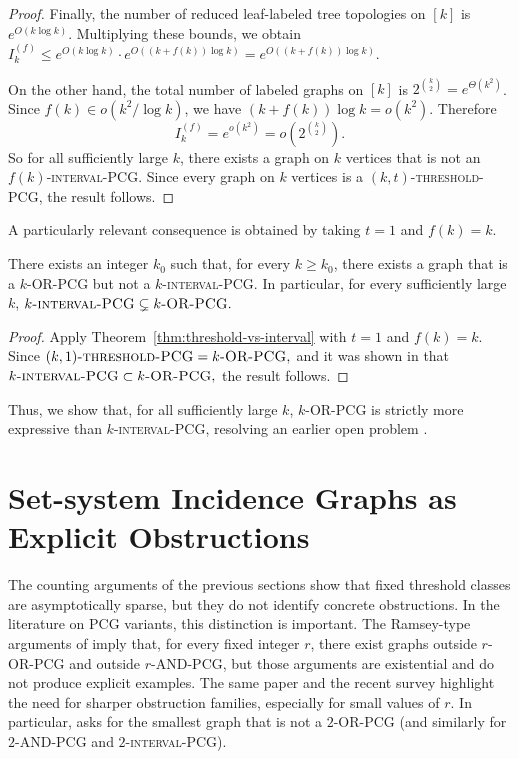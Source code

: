 \documentclass[a4paper,UKenglish,cleveref,autoref,thm-restate]{socg-lipics-v2021}
\begin{document}
\begin{proof}
Finally, the number of reduced leaf-labeled tree topologies on \([k]\) is
\(e^{O(k\log k)}\). Multiplying these bounds, we obtain
\(
I_k^{(f)}
\le e^{O(k\log k)}\cdot e^{O((k+f(k))\log k)}
 = e^{O((k+f(k))\log k)}.
\)

On the other hand, the total number of labeled graphs on $[k]$ is
$2^{\binom{k}{2}}=e^{\Theta(k^2)}$. Since $f(k)\in o(k^2/\log k)$, we have
$(k+f(k))\log k=o(k^2)$. Therefore
\[
I_k^{(f)} = e^{o(k^2)} = o\!\left(2^{\binom{k}{2}}\right).
\]
So for all sufficiently large $k$, there exists a graph on $k$ vertices that is not an
\textsc{$f(k)$-interval-\textsc{PCG}}. Since every graph on $k$ vertices is a
\textsc{$(k,t)$-threshold-\textsc{PCG}}, the result follows.
\end{proof}
A particularly relevant consequence is obtained by taking $t=1$ and $f(k)=k$.

\begin{corollary}\label{cor:kinterval-vs-kor}
There exists an integer $k_0$ such that, for every $k\ge k_0$, there exists a graph
that is a \textsc{$k$-\textsc{OR}-\textsc{PCG}} but not a
\textsc{$k$-interval-\textsc{PCG}}. In particular, for every sufficiently large $k$,
\(
k\textsc{-interval-\textsc{PCG}} \subsetneq k\textsc{-OR-\textsc{PCG}}.
\)
\end{corollary}

\begin{proof}
Apply Theorem~\ref{thm:threshold-vs-interval} with $t=1$ and $f(k)=k$. Since
\(
(k,1)\textsc{-threshold-\textsc{PCG}} = k\textsc{-OR-\textsc{PCG}},
\)
and it was shown in \cite{Calamoneri2021OnGOI} that
\(
k\textsc{-interval-\textsc{PCG}} \subset k\textsc{-OR-\textsc{PCG}},
\)
the result follows.
\end{proof}

Thus, we show that, for all sufficiently large $k$, \textsc{$k$-\textsc{OR}-\textsc{PCG}} is strictly
more expressive than \textsc{$k$-interval-\textsc{PCG}}, resolving an earlier open problem \cite{Calamoneri2021OnGOI, survey}.


\section{Set-system Incidence Graphs as Explicit Obstructions}\label{sec:incidence}

The counting arguments of the previous sections show that fixed threshold classes are
asymptotically sparse, but they do not identify concrete obstructions. In the literature
on \textsc{PCG} variants, this distinction is important. The Ramsey-type arguments of
\cite{Calamoneri2021OnGOI} imply that, for every fixed integer $r$, there exist graphs
outside \textsc{$r$-\textsc{OR}-\textsc{PCG}} and outside
\textsc{$r$-\textsc{AND}-\textsc{PCG}}, but those arguments are existential and do not
produce explicit examples. The same paper and the recent survey \cite{survey} highlight
the need for sharper obstruction families, especially for small values of $r$. In
particular, \cite{Calamoneri2021OnGOI} asks for the smallest graph that is not a
\textsc{$2$-\textsc{OR}-\textsc{PCG}} (and similarly for
\textsc{$2$-\textsc{AND}-\textsc{PCG}} and \textsc{$2$-interval-\textsc{PCG}}).
\end{document}
